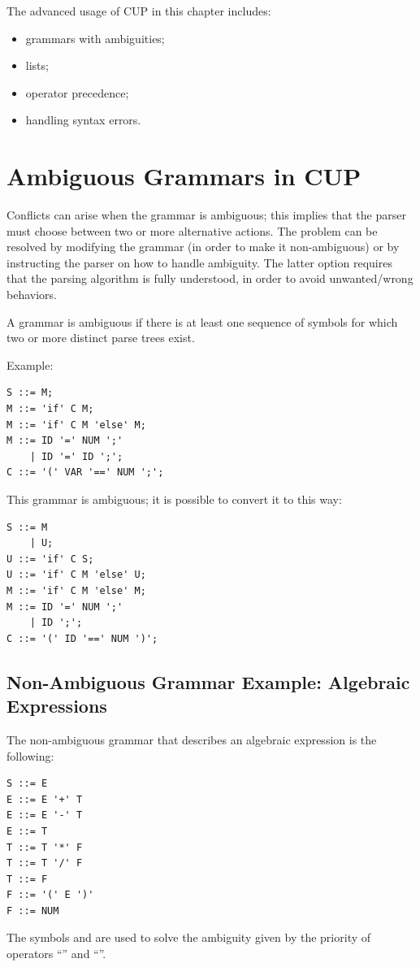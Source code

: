 The advanced usage of CUP in this chapter includes:
\begin{itemize}
    \item
    grammars with ambiguities;
    \item
    lists;
    \item
    operator precedence;
    \item
    handling syntax errors.
\end{itemize}

\section{Ambiguous Grammars in CUP}
Conflicts can arise when the grammar is ambiguous; this implies that the parser must choose between two or more alternative actions.
The problem can be resolved by modifying the grammar (in order to make it non-ambiguous) or by instructing the parser on how to handle ambiguity.
The latter option requires that the parsing algorithm is fully understood, in order to avoid unwanted/wrong behaviors.

A grammar is ambiguous if there is at least one sequence of symbols for which two or more distinct parse trees exist.

Example:
\begin{lstlisting}
S ::= M;
M ::= 'if' C M;
M ::= 'if' C M 'else' M;
M ::= ID '=' NUM ';'
    | ID '=' ID ';';
C ::= '(' VAR '==' NUM ';';
\end{lstlisting}
This grammar is ambiguous; it is possible to convert it to this way:
\begin{lstlisting}
S ::= M
    | U;
U ::= 'if' C S;
U ::= 'if' C M 'else' U;
M ::= 'if' C M 'else' M;
M ::= ID '=' NUM ';'
    | ID ';';
C ::= '(' ID '==' NUM ')';
\end{lstlisting}

\subsection{Non-Ambiguous Grammar Example: Algebraic Expressions}
The non-ambiguous grammar that describes an algebraic expression is the following:
\begin{lstlisting}
S ::= E
E ::= E '+' T
E ::= E '-' T
E ::= T
T ::= T '*' F
T ::= T '/' F
T ::= F
F ::= '(' E ')'
F ::= NUM
\end{lstlisting}
The symbols  and  are used to solve the ambiguity given by the priority of operators ``\code{+}'' and ``\code{-}''.

